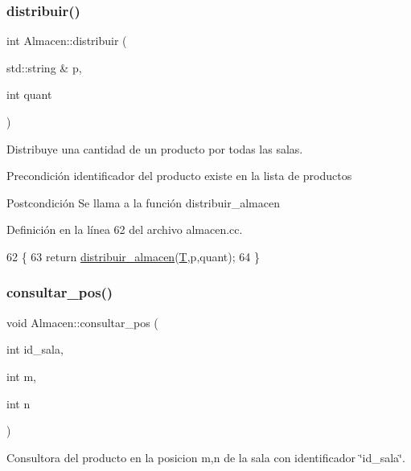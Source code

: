\subsubsection{\texorpdfstring{distribuir()}{distribuir()}}
{\footnotesize\ttfamily int Almacen\+::distribuir (\begin{DoxyParamCaption}\item[{std\+::string \&}]{p,  }\item[{int}]{quant }\end{DoxyParamCaption})}



Distribuye una cantidad de un producto por todas las salas. 

\begin{DoxyPrecond}{Precondición}
identificador del producto existe en la lista de productos 
\end{DoxyPrecond}
\begin{DoxyPostcond}{Postcondición}
Se llama a la función distribuir\+\_\+almacen 
\end{DoxyPostcond}


Definición en la línea 62 del archivo almacen.\+cc.


\begin{DoxyCode}
62                                            \{
63   \textcolor{keywordflow}{return} \mbox{\hyperlink{class_almacen_a2535172748b53c612e9347da5fd3bec6}{distribuir\_almacen}}(\mbox{\hyperlink{class_almacen_a15cd94a2b5bf5f5863b458eec53c9fd4}{T}},p,quant);
64 \}
\end{DoxyCode}
\mbox{\label{class_almacen_a18a63aaa7ce218993dcb4619e17b7633}} 
\subsubsection{\texorpdfstring{consultar\+\_\+pos()}{consultar\_pos()}}
{\footnotesize\ttfamily void Almacen\+::consultar\+\_\+pos (\begin{DoxyParamCaption}\item[{int}]{id\+\_\+sala,  }\item[{int}]{m,  }\item[{int}]{n }\end{DoxyParamCaption})}



Consultora del producto en la posicion m,n de la sala con identificador \char`\"{}id\+\_\+sala\char`\"{}. 

